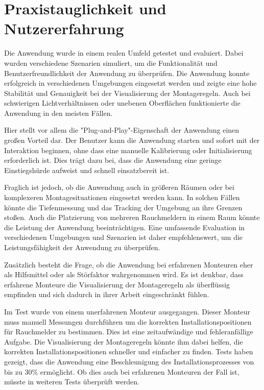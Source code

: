 \section{Praxistauglichkeit und Nutzererfahrung}

Die Anwendung wurde in einem realen Umfeld getestet und evaluiert. Dabei wurden verschiedene Szenarien simuliert, um die Funktionalität und Benutzerfreundlichkeit der Anwendung zu überprüfen. Die Anwendung konnte erfolgreich in verschiedenen Umgebungen eingesetzt werden und zeigte eine hohe Stabilität und Genauigkeit bei der Visualisierung der Montageregeln. Auch bei schwierigen Lichtverhältnissen oder unebenen Oberflächen funktionierte die Anwendung in den meisten Fällen.

Hier stellt vor allem die "Plug-and-Play"-Eigenschaft der Anwendung einen großen Vorteil dar. Der Benutzer kann die Anwendung starten und sofort mit der Interaktion beginnen, ohne dass eine manuelle Kalibrierung oder Initialisierung erforderlich ist. Dies trägt dazu bei, dass die Anwendung eine geringe Einstiegshürde aufweist und schnell einsatzbereit ist.

Fraglich ist jedoch, ob die Anwendung auch in größeren Räumen oder bei komplexeren Montagesituationen  eingesetzt werden kann. In solchen Fällen könnte die Tiefenmessung und das Tracking der Umgebung an ihre Grenzen stoßen. Auch die Platzierung von mehreren Rauchmeldern in einem Raum könnte die Leistung der Anwendung beeinträchtigen. Eine umfassende Evaluation in verschiedenen Umgebungen und Szenarien ist daher empfehlenswert, um die Leistungsfähigkeit der Anwendung zu überprüfen.

Zusätzlich besteht die Frage, ob die Anwendung bei erfahrenen Monteuren eher als Hilfsmittel oder als Störfaktor wahrgenommen wird. Es ist denkbar, dass erfahrene Monteure die Visualisierung der Montageregeln als überflüssig empfinden und sich dadurch in ihrer Arbeit eingeschränkt fühlen. 

Im Test wurde von einem unerfahrenen Monteur ausgegangen. Dieser Monteur muss manuell Messungen durchführen um die korrekten Installationspositionen für Rauchmelder zu bestimmen. Dies ist eine zeitaufwändige und fehleranfällige Aufgabe. Die Visualisierung der Montageregeln könnte ihm dabei helfen, die korrekten Installationspositionen schneller und einfacher zu finden. Tests haben gezeigt, dass die Anwendung eine Beschleunigung des Installationsprozesses von bis zu 30\% ermöglicht. Ob dies auch bei erfahrenen Monteuren der Fall ist, müsste in weiteren Tests überprüft werden.

